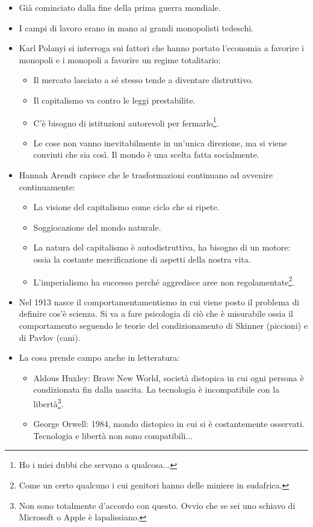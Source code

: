 \begin{itemize}
  \item Già cominciato dalla fine della prima guerra mondiale. 
  \item I campi di lavoro erano in mano ai grandi monopolisti tedeschi. 
  \item Karl Polanyi si interroga sui fattori che hanno portato l'economia a favorire i monopoli e i monopoli a favorire un regime totalitario:
    \begin{itemize}
      \item Il mercato lasciato a sé stesso tende a diventare distruttivo. 
      \item Il capitalismo va contro le leggi prestabilite. 
      \item C'è bisogno di istituzioni autorevoli per fermarlo\footnote{Ho i miei dubbi che servano a qualcosa...}. 
      \item Le cose non vanno inevitabilmente in un'unica direzione, ma si viene convinti che sia così. Il mondo è una scelta fatta socialmente. 
    \end{itemize}
  \item Hannah Arendt capisce che le trasformazioni continuano ad avvenire continuamente: 
    \begin{itemize}
      \item La visione del capitalismo come ciclo che si ripete. 
      \item Soggiocazione del mondo naturale. 
      \item La natura del capitalismo è autodistruttiva, ha bisogno di un motore: ossia la costante mercificazione di aspetti della nostra vita. 
      \item L'imperialismo ha successo perché aggredisce aree non regolamentate\footnote{Come un certo qualcuno i cui genitori hanno delle miniere in sudafrica.}.
    \end{itemize}
  \item Nel 1913 nasce il comportamentamentismo in cui viene posto il problema di definire cos'è scienza. Si va a fare psicologia di ciò che è misurabile ossia il comportamento seguendo le teorie del condizionamento di Skinner (piccioni) e di Pavlov (cani). 
  \item La cosa prende campo anche in letteratura: 
    \begin{itemize}
      \item Aldous Huxley: Brave New World, società distopica in cui ogni persona è condizionata fin dalla nascita. La tecnologia è incompatibile con la libertà\footnote{Non sono totalmente d'accordo con questo. Ovvio che se sei uno schiavo di Microsoft o Apple è lapalissiano.}.
      \item George Orwell: 1984, mondo distopico in cui si è costantemente osservati. Tecnologia e libertà non sono compatibili...  
    \end{itemize}
\end{itemize}


